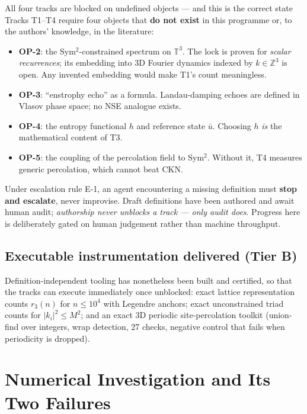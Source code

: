 \documentclass[11pt,a4paper]{article}
\newcommand{\tB}{\textcolor{TierB}{\textbf{Tier B}}}
\newcommand{\T}{\mathbb{T}}
\newcommand{\Z}{\mathbb{Z}}
\theoremstyle{definition}
\theoremstyle{plain}
\begin{document}
\begin{warnbox}{All four tracks are blocked on undefined objects --- and this is the correct state}
Tracks T1--T4 require four objects that \textbf{do not exist} in this programme or, to the
authors' knowledge, in the literature:
\begin{itemize}[leftmargin=*,nosep]
\item \textbf{OP-2}: the Sym$^2$-constrained spectrum on $\T^3$. The lock is proven for
\emph{scalar recurrences}; its embedding into 3D Fourier dynamics indexed by $k\in\Z^3$ is
open. Any invented embedding would make T1's count meaningless.
\item \textbf{OP-3}: ``enstrophy echo'' as a formula. Landau-damping echoes are defined in
Vlasov phase space; no NSE analogue exists.
\item \textbf{OP-4}: the entropy functional $h$ and reference state $\bar u$. Choosing $h$
\emph{is} the mathematical content of T3.
\item \textbf{OP-5}: the coupling of the percolation field to Sym$^2$. Without it, T4
measures generic percolation, which cannot beat CKN.
\end{itemize}
Under escalation rule E-1, an agent encountering a missing definition must \textbf{stop and
escalate}, never improvise. Draft definitions have been authored and await human audit;
\emph{authorship never unblocks a track --- only audit does}. Progress here is deliberately
gated on human judgement rather than machine throughput.
\end{warnbox}

\subsection{Executable instrumentation delivered (\tB{})}

Definition-independent tooling has nonetheless been built and certified, so that the tracks
can execute immediately once unblocked: exact lattice representation counts $r_3(n)$ for
$n\le10^4$ with Legendre anchors; exact unconstrained triad counts for $|k_i|^2\le M^2$; and
an exact 3D periodic site-percolation toolkit (union-find over integers, wrap detection, 27
checks, negative control that fails when periodicity is dropped).

\section{Numerical Investigation and Its Two Failures}
\label{sec:numerics}
\end{document}
